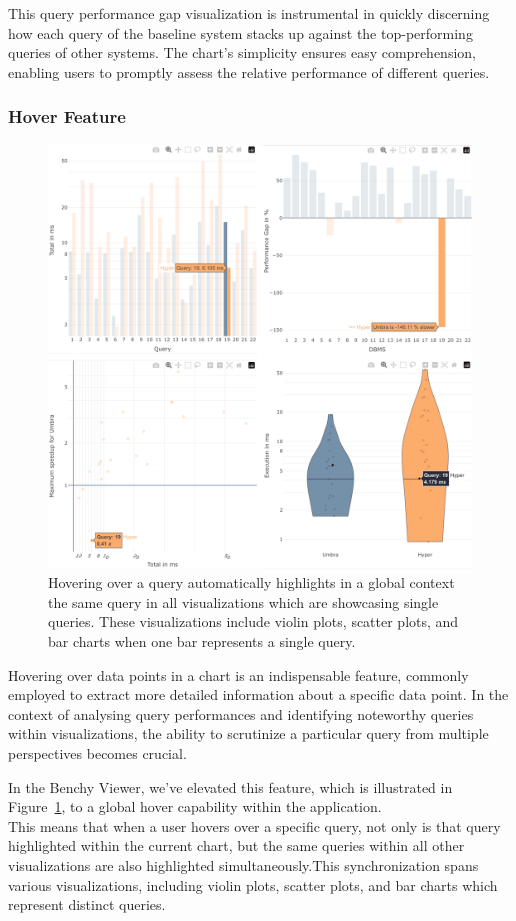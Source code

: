 This query performance gap visualization is instrumental in quickly discerning how each query of the baseline system stacks up against the top-performing queries of other systems. The chart's simplicity ensures easy comprehension, enabling users to promptly assess the relative performance of different queries.




\subsubsection{Hover Feature}\label{sec:hover-feature}

\begin{figure}[h]
  \centering
  \includegraphics[width=0.6\linewidth]{figures/hover-group.png}
  \caption{Hovering over a query automatically highlights in a global context the same query in all visualizations which are showcasing single queries. These visualizations include violin plots, scatter plots, and bar charts when one bar represents a single query.}
  \label{fig:hover-group}
\end{figure}

Hovering over data points in a chart is an indispensable feature, commonly employed to extract more detailed information about a specific data point. In the context of analysing query performances and identifying noteworthy queries within visualizations, the ability to scrutinize a particular query from multiple perspectives becomes crucial.


 In the Benchy Viewer, we've elevated this feature, which is illustrated in Figure~\ref{fig:hover-group}, to a global hover capability within the application.\\
 This means that when a user hovers over a specific query, not only is that query highlighted within the current chart, but the same queries within all other visualizations are also highlighted simultaneously.This synchronization spans various visualizations, including violin plots, scatter plots, and bar charts which represent distinct queries.



